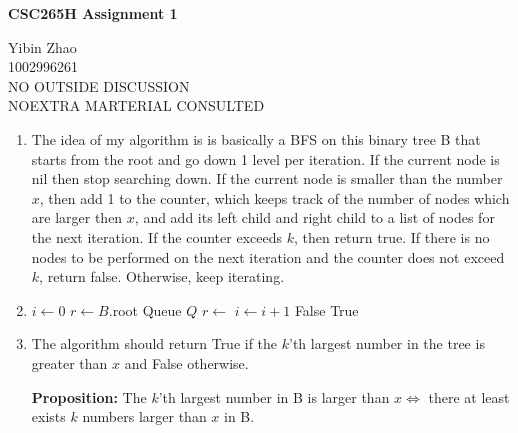 \documentclass[10pt]{article}
\begin{document}
\begin{center}
{\bf \Large \bf CSC265H Assignment 1}\\
\end{center}

\noindent
Yibin Zhao\\
1002996261\\
NO OUTSIDE DISCUSSION\\
NOEXTRA MARTERIAL CONSULTED \\


\begin{enumerate}

\item
	The idea of my algorithm is is basically a BFS on this binary tree B that starts from the root and go down 1 level per iteration. If the current node is nil then stop searching down. If the current node is smaller than the number $x$, then add 1 to the counter, which keeps track of the number of nodes which are larger then $x$, and add its left child and right child to a list of nodes for the next iteration. If the counter exceeds $k$, then return true. If there is no nodes to be performed on the next iteration and the counter does not exceed $k$, return false. Otherwise, keep iterating.

\item 
\begin{algorithmic}[1]
		\State $i \gets 0$
		\State $r \gets B$.root
		\State Queue $Q$ 
		\State {} 
		 
			\State $r \gets$ 
				\State {}
				\State {}
				\State $i \gets i+1$
			\EndIf
		\EndWhile
			\State \Return False
		\Else
			\State \Return True
		\EndIf
	\EndFunction
\end{algorithmic}


\item %
	The algorithm should return True if the $k$'th largest number in the tree is greater than $x$ and False otherwise. 
   
\begin{addmargin}[1em]{0em}
    \textbf{Proposition:} The $k$'th largest number in B is larger than $x
    \iff$ there at least exists $k$ numbers larger than $x$ in B.
    

\end{addmargin}
\end{enumerate}
\end{document}
